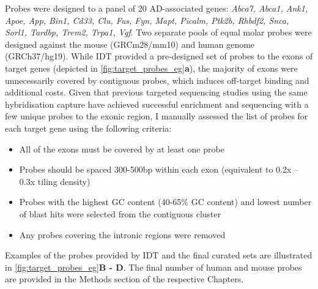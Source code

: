 
Probes were designed to a panel of 20 AD-associated genes: \textit{Abca7, Abca1, Ank1, Apoe, App, Bin1, Cd33, Clu, Fus, Fyn, Mapt, Picalm, Ptk2b, Rhbdf2, Snca, Sorl1, Tardbp, Trem2, Trpa1, Vgf}. Two separate pools of equal molar probes were designed against the mouse (GRCm28/mm10) and human genome (GRCh37/hg19). While IDT provided a pre-designed set of probes to the exons of target genes (depicted in \cref{fig:target_probes_eg}\textbf{a}), the majority of exons were unnecessarily covered by contiguous probes, which induces off-target binding and additional costs. Given that previous targeted sequencing studies using the same hybridisation capture have achieved successful enrichment and sequencing with a few unique probes to the exonic region\cite{Sheynkman2020}, I manually assessed the list of probes for each target gene using the following criteria:
\begin{itemize}
	\item All of the exons must be covered by at least one probe
	\item Probes should be spaced 300-500bp within each exon (equivalent to 0.2x – 0.3x tiling density) 
	\item Probes with the highest GC content (40-65\% GC content) and lowest number of blast hits were selected from the contiguous cluster 
	\item Any probes covering the intronic regions were removed
\end{itemize}
Examples of the probes provided by IDT and the final curated sets are illustrated in  \cref{fig:target_probes_eg}\textbf{B - D}. The final number of human and mouse probes are provided in the Methods section of the respective Chapters.

